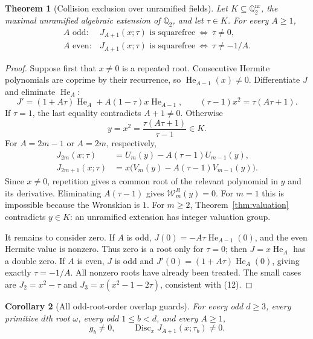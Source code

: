 \documentclass[11pt]{article}
\newtheorem{theorem}{Theorem}
\newtheorem{corollary}[theorem]{Corollary}
\theoremstyle{remark}\newtheorem{remark}[theorem]{Remark}
\newcommand{\He}{\operatorname{He}}
\newcommand{\Disc}{\operatorname{Disc}}
\newcommand{\Q}{\mathbb{Q}}
\begin{document}
\begin{theorem}[Collision exclusion over unramified fields]
\label{thm:unramified}
Let $K\subseteq\Q_2^{\mathrm{nr}}$, the maximal unramified algebraic
extension of $\Q_2$, and let $\tau\in K$. For every $A\geq1$,
\[
\begin{array}{ll}
A\text{ odd}:&
J_{A+1}(x;\tau)\text{ is squarefree}\ \Longleftrightarrow\ \tau\ne0,\\[2pt]
A\text{ even}:&
J_{A+1}(x;\tau)\text{ is squarefree}\ \Longleftrightarrow\ \tau\ne-1/A.
\end{array}
\tag{12}
\]
\end{theorem}

\begin{proof}
Suppose first that $x\ne0$ is a repeated root. Consecutive Hermite
polynomials are coprime by their recurrence, so
$\He_{A-1}(x)\ne0$. Differentiate $J$ and eliminate $\He_A$:
\[
J'=(1+A\tau)\He_A+A(1-\tau)x\He_{A-1},\qquad
(\tau-1)x^2=\tau(A\tau+1).
\tag{13}
\]
If $\tau=1$, the last equality contradicts $A+1\ne0$.
Otherwise
\[
y=x^2=\frac{\tau(A\tau+1)}{\tau-1}\in K.
\tag{14}
\]
For $A=2m-1$ or $A=2m$, respectively,
\begin{align*}
J_{2m}(x;\tau)&=U_m(y)-A(\tau-1)U_{m-1}(y),\\
J_{2m+1}(x;\tau)&=x\bigl(V_m(y)-A(\tau-1)V_{m-1}(y)\bigr).
\end{align*}
Since $x\ne0$, repetition gives a common root of the relevant
polynomial in $y$ and its derivative. Eliminating $A(\tau-1)$
gives $\mathcal W_m^R(y)=0$. For $m=1$ this is impossible because
the Wronskian is $1$. For $m\geq2$, Theorem~\ref{thm:valuation}
contradicts $y\in K$: an unramified extension has integer
valuation group.

It remains to consider zero. If $A$ is odd,
$J(0)=-A\tau\He_{A-1}(0)$, and the even Hermite value is nonzero.
Thus zero is a root only for $\tau=0$; then $J=x\He_A$ has a
double zero. If $A$ is even, $J$ is odd and
$J'(0)=(1+A\tau)\He_A(0)$, giving exactly $\tau=-1/A$.
All nonzero roots have already been treated. The small cases are
$J_2=x^2-\tau$ and $J_3=x(x^2-1-2\tau)$, consistent with (12).
\end{proof}

\begin{corollary}[All odd-root-order overlap guards]\label{cor:allJ}
For every odd $d\geq3$, every primitive $d$th root $\omega$, every
odd $1\leq b<d$, and every $A\geq1$,
\[
g_b\ne0,\qquad \Disc_xJ_{A+1}(x;\tau_b)\ne0.
\tag{15}
\]
\end{corollary}
\end{document}
